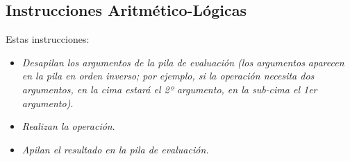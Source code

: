

\subsection{Instrucciones Aritmético-Lógicas}

Estas instrucciones:

\begin{itemize}
    \item \textit{Desapilan los argumentos de la pila de evaluación (los argumentos aparecen en la pila en orden inverso; por ejemplo,
si la operación necesita dos argumentos, en la cima estará el 2º argumento, en la sub-cima el 1er argumento)}.
    \item \textit{ Realizan la operación}.
    \item \textit{Apilan el resultado en la pila de evaluación.}
    
\end{itemize}
 
